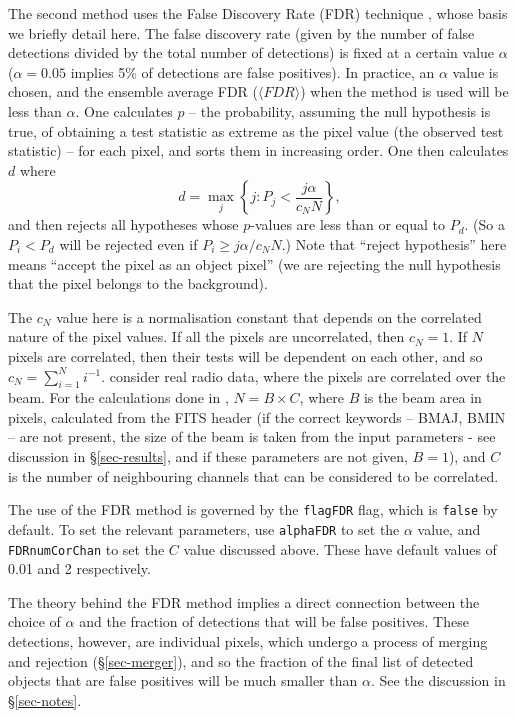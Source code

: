 The second method uses the False Discovery Rate (FDR) technique
\citep{miller01,hopkins02}, whose basis we briefly detail here. The
false discovery rate (given by the number of false detections divided
by the total number of detections) is fixed at a certain value
$\alpha$ (\eg $\alpha=0.05$ implies 5\% of detections are false
positives). In practice, an $\alpha$ value is chosen, and the ensemble
average FDR (\ie $\langle FDR \rangle$) when the method is used will
be less than $\alpha$.  One calculates $p$ -- the probability,
assuming the null hypothesis is true, of obtaining a test statistic as
extreme as the pixel value (the observed test statistic) -- for each
pixel, and sorts them in increasing order. One then calculates $d$
where
\[
d = \max_j \left\{ j : P_j < \frac{j\alpha}{c_N N} \right\},
\]
and then rejects all hypotheses whose $p$-values are less than or
equal to $P_d$. (So a $P_i<P_d$ will be rejected even if $P_i \geq
j\alpha/c_N N$.) Note that ``reject hypothesis'' here means ``accept
the pixel as an object pixel'' (\ie we are rejecting the null
hypothesis that the pixel belongs to the background).

The $c_N$ value here is a normalisation constant that depends on the
correlated nature of the pixel values. If all the pixels are
uncorrelated, then $c_N=1$. If $N$ pixels are correlated, then their
tests will be dependent on each other, and so $c_N = \sum_{i=1}^N
i^{-1}$. \citet{hopkins02} consider real radio data, where the pixels
are correlated over the beam. For the calculations done in \duchamp,
$N = B \times C$, where $B$ is the beam area in pixels, calculated
from the FITS header (if the correct keywords -- BMAJ, BMIN -- are not
present, the size of the beam is taken from the input parameters - see
discussion in \S\ref{sec-results}, and if these parameters are not
given, $B=1$), and $C$ is the number of neighbouring channels that can
be considered to be correlated.

The use of the FDR method is governed by the \texttt{flagFDR} flag,
which is \texttt{false} by default. To set the relevant parameters,
use \texttt{alphaFDR} to set the $\alpha$ value, and
\texttt{FDRnumCorChan} to set the $C$ value discussed above. These
have default values of 0.01 and 2 respectively.

The theory behind the FDR method implies a direct connection between
the choice of $\alpha$ and the fraction of detections that will be
false positives. These detections, however, are individual pixels,
which undergo a process of merging and rejection (\S\ref{sec-merger}),
and so the fraction of the final list of detected objects that are
false positives will be much smaller than $\alpha$. See the discussion
in \S\ref{sec-notes}.


